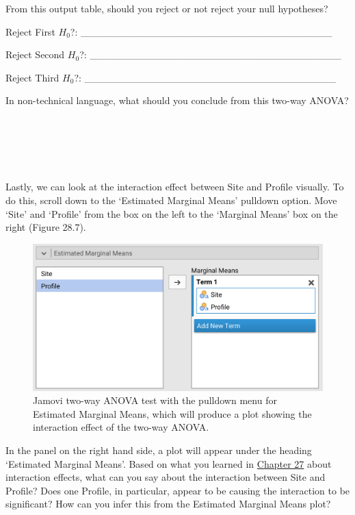 \documentclass[
]{scrbook}
\begin{document}
From this output table, should you reject or not reject your null hypotheses?

Reject First \(H_{0}\)?: \_\_\_\_\_\_\_\_\_\_\_\_\_\_\_\_\_\_\_\_\_\_\_\_\_\_\_\_\_\_\_\_\_\_\_

Reject Second \(H_{0}\)?: \_\_\_\_\_\_\_\_\_\_\_\_\_\_\_\_\_\_\_\_\_\_\_\_\_\_\_\_\_\_\_\_\_\_\_

Reject Third \(H_{0}\)?: \_\_\_\_\_\_\_\_\_\_\_\_\_\_\_\_\_\_\_\_\_\_\_\_\_\_\_\_\_\_\_\_\_\_\_

In non-technical language, what should you conclude from this two-way ANOVA?

\begin{verbatim}





\end{verbatim}

Lastly, we can look at the interaction effect between Site and Profile visually.
To do this, scroll down to the `Estimated Marginal Means' pulldown option.
Move `Site' and `Profile' from the box on the left to the `Marginal Means' box on the right (Figure 28.7).

\begin{figure}
\includegraphics[width=1\linewidth]{img/jamovi_marginal_means} \caption{Jamovi two-way ANOVA test with the pulldown menu for Estimated Marginal Means, which will produce a plot showing the interaction effect of the two-way ANOVA.}\label{fig:unnamed-chunk-135}
\end{figure}

In the panel on the right hand side, a plot will appear under the heading `Estimated Marginal Means'.
Based on what you learned in \protect\hyperlink{Chapter_27}{Chapter 27} about interaction effects, what can you say about the interaction between Site and Profile?
Does one Profile, in particular, appear to be causing the interaction to be significant?
How can you infer this from the Estimated Marginal Means plot?
\end{document}
